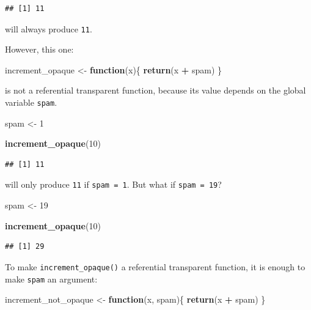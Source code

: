 \documentclass[]{gitbook}
\newenvironment{Shaded}{\begin{snugshade}}{\end{snugshade}}
\newcommand{\ControlFlowTok}[1]{\textcolor[rgb]{0.13,0.29,0.53}{\textbf{#1}}}
\newcommand{\DecValTok}[1]{\textcolor[rgb]{0.00,0.00,0.81}{#1}}
\newcommand{\KeywordTok}[1]{\textcolor[rgb]{0.13,0.29,0.53}{\textbf{#1}}}
\newcommand{\NormalTok}[1]{#1}
\newcommand{\OperatorTok}[1]{\textcolor[rgb]{0.81,0.36,0.00}{\textbf{#1}}}
\newcommand{\StringTok}[1]{\textcolor[rgb]{0.31,0.60,0.02}{#1}}
\theoremstyle{definition}
\theoremstyle{definition}
\theoremstyle{definition}
\theoremstyle{remark}
\begin{document}
\begin{verbatim}
## [1] 11
\end{verbatim}

will always produce \texttt{11}.

However, this one:

\begin{Shaded}
\begin{Highlighting}[]
\NormalTok{increment_opaque <-}\StringTok{ }\ControlFlowTok{function}\NormalTok{(x)\{}
    \KeywordTok{return}\NormalTok{(x }\OperatorTok{+}\StringTok{ }\NormalTok{spam)}
\NormalTok{\}}
\end{Highlighting}
\end{Shaded}

is not a referential transparent function, because its value depends on
the global variable \texttt{spam}.

\begin{Shaded}
\begin{Highlighting}[]
\NormalTok{spam <-}\StringTok{ }\DecValTok{1}

\KeywordTok{increment_opaque}\NormalTok{(}\DecValTok{10}\NormalTok{)}
\end{Highlighting}
\end{Shaded}

\begin{verbatim}
## [1] 11
\end{verbatim}

will only produce \texttt{11} if \texttt{spam\ =\ 1}. But what if
\texttt{spam\ =\ 19}?

\begin{Shaded}
\begin{Highlighting}[]
\NormalTok{spam <-}\StringTok{ }\DecValTok{19}

\KeywordTok{increment_opaque}\NormalTok{(}\DecValTok{10}\NormalTok{)}
\end{Highlighting}
\end{Shaded}

\begin{verbatim}
## [1] 29
\end{verbatim}

To make \texttt{increment\_opaque()} a referential transparent function,
it is enough to make \texttt{spam} an argument:

\begin{Shaded}
\begin{Highlighting}[]
\NormalTok{increment_not_opaque <-}\StringTok{ }\ControlFlowTok{function}\NormalTok{(x, spam)\{}
    \KeywordTok{return}\NormalTok{(x }\OperatorTok{+}\StringTok{ }\NormalTok{spam)}
\NormalTok{\}}
\end{Highlighting}
\end{Shaded}
\end{document}
